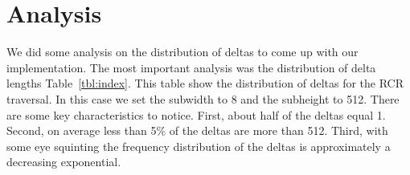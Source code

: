 \section{Analysis}
\label{sec:index_compression_analysis}

We did some analysis on the distribution of deltas to come up with our implementation. The most important analysis was the distribution of delta lengths Table~\ref{tbl:index}. This table show the distribution of deltas for the RCR traversal. In this case we set the subwidth to 8 and the subheight to 512. There are some key characteristics to notice. First, about half of the deltas equal 1. Second, on average less than 5\% of the deltas are more than 512. Third, with some eye squinting the frequency distribution of the deltas is approximately a decreasing exponential.

